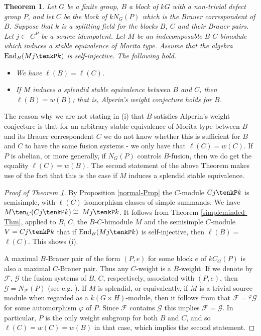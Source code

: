 \documentclass{amsart}
\theoremstyle{plain}\newtheorem{Theorem}{Theorem}[section]
\theoremstyle{plain}\newtheorem{Conjecture}[Theorem]{Conjecture}
\theoremstyle{plain}\newtheorem{Corollary}[Theorem]{Corollary}
\theoremstyle{plain}\newtheorem{Lemma}[Theorem]{Lemma}
\theoremstyle{plain}\newtheorem{Proposition}[Theorem]{Proposition}
\theoremstyle{definition}\newtheorem{Definition}[Theorem]{Definition}
\theoremstyle{definition}\newtheorem{Example}[Theorem]{Example}
\theoremstyle{definition}\newtheorem{Examples}[Theorem]{Examples}
\theoremstyle{definition}\newtheorem{Exercise}[Theorem]{Exercise}
\theoremstyle{definition}\newtheorem{Notation}[Theorem]{Notation}
\theoremstyle{definition}\newtheorem{Remark}[Theorem]{Remark}
\theoremstyle{definition}\newtheorem{Remarks}[Theorem]{Remarks}
\theoremstyle{plain}\newtheorem{Statement}[Theorem]{}
\def\CF{{\mathcal{F}}}  \def\OS{{\mathcal{O}S}}
\def\CG{{\mathcal{G}}}  \def\OT{{\mathcal{O}T}}
\def\End{\mathrm{End}}
\begin{document}
\begin{Theorem} \label{stable-Brauer-corr}
Let $G$ be a finite group, $B$ a block of $kG$ with a non-trivial defect group $P$,
and let $C$ be  the block of $kN_G(P)$ which is  the Brauer correspondent of $B$.
Suppose that $k$ is a splitting field  for the blocks $B$, $C$ and their Brauer pairs.
Let $j\in$ $C^P$ be a source idempotent.
Let $M$ be an indecomposable $B$-$C$-bimodule which induces a stable
equivalence of Morita type. Assume that the algebra $\End_B(Mj\tenkP k)$ is 
self-injective. The following hold.
\begin{itemize}
\item[{\rm (i)}] 
We have  $\ell(B)=\ell(C)$. 
\item[{\rm (ii)}]
If $M$ induces a splendid stable  equivalence  between $B$ and $C$, then 
$\ell(B)=w(B)$; that is,  Alperin's weight conjecture holds for $B$.
\end{itemize}
\end{Theorem}

The reason why  we are not stating in (i)   that $B$ satisfies Alperin's weight conjecture
is that for an arbitrary stable equivalence of Morita type between $B$ and its Brauer 
correspondent $C$ we do not know whether  this is sufficient for $B$ 
and $C$ to have  the same fusion systems - we only have 
that $\ell(C)=w(C)$. If $P$ is abelian, or more generally, if $N_G(P)$ controls 
$B$-fusion, then we do get the equality $\ell(C)=w(B)$. The second statement 
of the above Theorem makes use of the fact  that this is the  case if $M$ induces a 
splendid stable  equivalence. 


\begin{proof}[{Proof of Theorem \ref{stable-Brauer-corr}}]
By Proposition \ref{normal-Prop} the $C$-module $Cj\tenkP k$ is semisimple,
with $\ell(C)$ isomorphism classes of simple summands. We have
$M\ten_C (Cj\tenkP k)\cong$ $Mj\tenkP k$. 
It follows from Theorem \ref{simpleminded-Thm}, applied
to $B$, $C$, the $B$-$C$-bimodule  $M$ and the semisimple $C$-module 
$V=Cj\tenkP k$ that if $\End_B(Mj\tenkP k)$ is self-injective, then $\ell(B)=$ 
$\ell(C)$. This shows (i).

A maximal $B$-Brauer pair of the form $(P,e)$ for some block $e$ of $kC_G(P)$
 is also a  maximal $C$-Brauer pair.
Thus any $C$-weight is a $B$-weight. If we denote by $\CF$, $\CG$ the
fusion systems of $B$, $C$, respectively, associated with $(P,e)$,
then $\CG = N_\CF(P)$ (see e.g. \cite[Proposition 8.5.4]{LiBookII}).
If $M$ is splendid, or equivalently, if $M$ is a trivial source module  when
regarded as a $k(G\times H)$-module, then it follows from 
\cite[Theorem 9.8.2]{LiBookII} that $\CF={^\varphi{\CG}}$ for some
automorphism $\varphi$ of $P$. Since $\CF$ contains $\CG$ this implies 
$\CF=\CG$. 
In particular, $P$ is the only weight subgroup for both $B$ and $C$, and so 
$\ell(C)=w(C)=w(B)$ in that case, which implies the second statement.
\end{proof}
\end{document}

